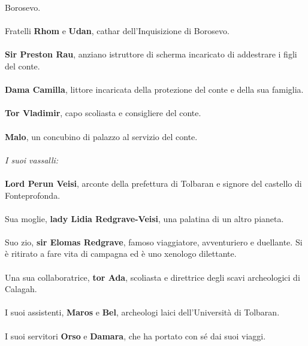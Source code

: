 Borosevo.
\leavevmode\\
\leavevmode\\
\phantom{123}Fratelli \textbf{Rhom} e \textbf{Udan}, cathar dell'Inquisizione di
Borosevo.
\leavevmode\\
\leavevmode\\
\phantom{123}\textbf{Sir Preston Rau}, anziano istruttore di scherma incaricato di
addestrare i figli del conte.
\leavevmode\\
\leavevmode\\
\phantom{123}\textbf{Dama Camilla}, littore incaricata della protezione del conte e
della sua famiglia.
\leavevmode\\
\leavevmode\\
\phantom{123}\textbf{Tor Vladimir}, capo scoliasta e consigliere del conte.
\leavevmode\\
\leavevmode\\
\phantom{123}\textbf{Malo}, un concubino di palazzo al servizio del conte.
\leavevmode\\
\leavevmode\\
\textit{I suoi vassalli:}
\leavevmode\\
\leavevmode\\
\phantom{123}\textbf{Lord Perun Veisi}, arconte della prefettura di Tolbaran e
signore del castello di Fonteprofonda.
\leavevmode\\
\leavevmode\\
\phantom{123}Sua moglie, \textbf{lady Lidia Redgrave-Veisi}, una palatina di un altro
pianeta.
\leavevmode\\
\leavevmode\\
\phantom{123}Suo zio, \textbf{sir Elomas Redgrave}, famoso viaggiatore, avventuriero
e duellante. Si è ritirato a fare vita di campagna ed è uno xenologo
dilettante.
\leavevmode\\
\leavevmode\\
\phantom{123}Una sua collaboratrice, \textbf{tor Ada}, scoliasta e direttrice degli
scavi archeologici di Calagah.
\leavevmode\\
\leavevmode\\
\phantom{123}I suoi assistenti, \textbf{Maros} e \textbf{Bel}, archeologi laici
dell'Università di Tolbaran.
\leavevmode\\
\leavevmode\\
\phantom{123}I suoi servitori \textbf{Orso} e \textbf{Damara}, che ha portato con sé
dai suoi viaggi.
\leavevmode\\
\leavevmode\\

